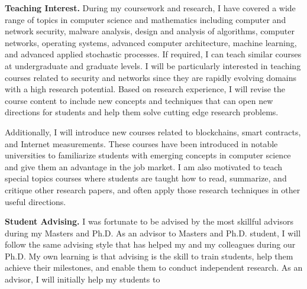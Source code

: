 \documentclass{NSF}
\newcommand{\BfPara}[1]{{\noindent\textbf{#1.}}\xspace}
\begin{document}
\BfPara{Teaching Interest} During my coursework and research, I have covered a wide range of topics in computer science and mathematics including computer and network security, malware analysis, design and analysis of algorithms, computer networks, operating systems, advanced computer architecture, machine learning, and advanced applied stochastic processes. If required, I can teach similar courses at undergraduate and graduate levels. I will be particularly interested in teaching courses related to security and networks since they are rapidly evolving domains with a high research potential. Based on research experience, I will revise the course content to include new concepts and techniques that can open new directions for students and help them solve cutting edge research problems. 

Additionally, I will introduce new courses related to blockchains, smart contracts, and Internet measurements. These courses have been introduced in notable universities to familiarize students with emerging concepts in computer science and give them an advantage in the job market. I am also motivated to teach special topics courses where students are taught how to read, summarize, and critique other research papers, and often apply those research techniques in other useful directions. 

\BfPara{Student Advising} I was fortunate to be advised by the most skillful advisors during my Masters and Ph.D. As an advisor to Masters and Ph.D. student, I will follow the same advising style that has helped my and my colleagues during our Ph.D. My own learning is that advising is the skill to train students, help them achieve their milestones, and enable them to conduct independent research. As an advisor, I will initially help my students to  

\end{document}
